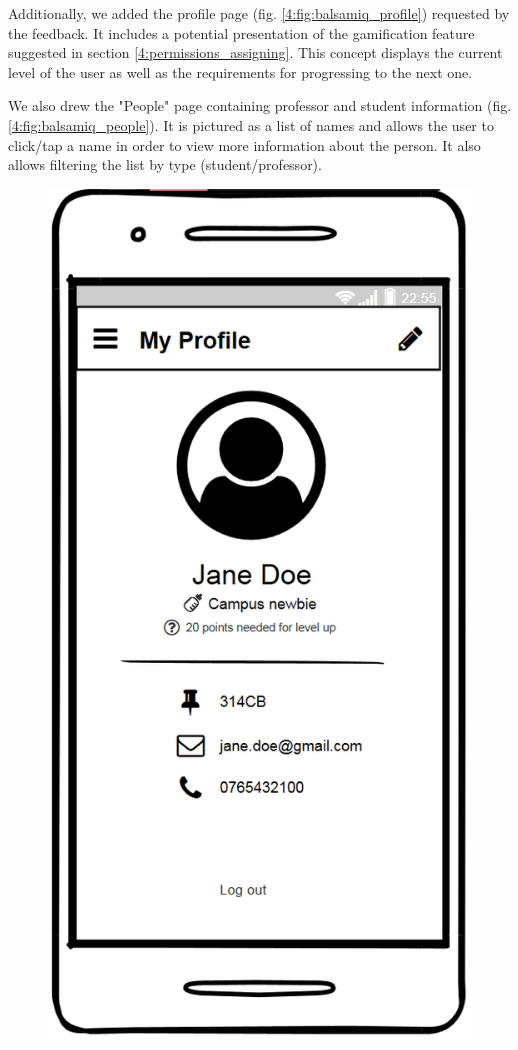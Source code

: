 Additionally, we added the profile page (fig. \ref{4:fig:balsamiq_profile}) requested by the feedback. It includes a potential presentation of the gamification feature suggested in section \ref{4:permissions_assigning}. This concept displays the current level of the user as well as the requirements for progressing to the next one.

We also drew the "People" page containing professor and student information (fig. \ref{4:fig:balsamiq_people}). It is pictured as a list of names and allows the user to click/tap a name in order to view more information about the person. It also allows filtering the list by type (student/professor).

\begin{figure}[!ht]
    \centering
    \begin{minipage}[b]{0.3\textwidth}
        \captionsetup{justification=centering}
        \includegraphics[width=\textwidth]{figures/app/balsamiq/profile.png}

\end{minipage}
\end{figure}
